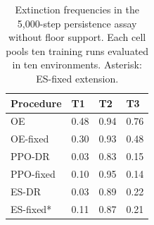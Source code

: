\begin{table}[tb]
\centering\small
\caption{Extinction frequencies in the 5,000-step persistence assay without floor support. Each cell pools ten training runs evaluated in ten environments. Asterisk: ES-fixed extension.}\label{tab:persistence}
\begin{tabularx}{\linewidth}{lYYY}
\toprule
Procedure & T1 & T2 & T3\\\midrule
OE & 0.48 & 0.94 & 0.76\\
OE-fixed & 0.30 & 0.93 & 0.48\\
PPO-DR & 0.03 & 0.83 & 0.15\\
PPO-fixed & 0.10 & 0.95 & 0.14\\
ES-DR & 0.03 & 0.89 & 0.22\\
ES-fixed* & 0.11 & 0.87 & 0.21\\
\bottomrule
\end{tabularx}
\end{table}
